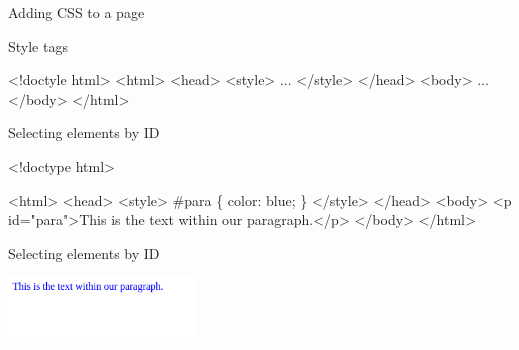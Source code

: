 \documentclass{beamer}
\begin{document}
\begin{frame}[fragile]{Adding CSS to a page}
 \begin{block}{Style tags}
\begin{semiverbatim}
<!doctyle html>
<html>
  <head>
    <style>
      ...
    </style>
  </head>
  <body>
    ...
  </body>
</html>
\end{semiverbatim}
\end{block}
\end{frame}

\begin{frame}[fragile]{Selecting elements by ID}
 \begin{block}{}
\begin{semiverbatim}
<!doctype html>

<html>
  <head>
    <style>
      #para \{
         color: blue;
      \}
    </style>
  </head>
  <body>
    <p id="para">This is the text within our paragraph.</p>
  </body>
</html>
\end{semiverbatim}
\end{block}
\end{frame}

\begin{frame}{Selecting elements by ID}
  \begin{block}{}
    \includegraphics[width=5cm]{byId.png}
  \end{block}
\end{frame}
\end{document}

